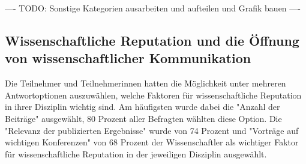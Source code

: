 ---- TODO: Sonstige Kategorien ausarbeiten und aufteilen und Grafik bauen ----

\subsection{Wissenschaftliche Reputation und die Öffnung von wissenschaftlicher Kommunikation}

Die Teilnehmer und Teilnehmerinnen hatten die Möglichkeit unter mehreren Antwortoptionen auszuwählen, welche Faktoren für wissenschaftliche Reputation in ihrer Disziplin wichtig sind. Am häufigsten wurde dabei die "Anzahl der Beiträge" ausgewählt, 80 Prozent aller Befragten wählten diese Option. Die "Relevanz der publizierten Ergebnisse" wurde von 74 Prozent und "Vorträge auf wichtigen Konferenzen" von 68 Prozent der Wissenschaftler als wichtiger Faktor für wissenschaftliche Reputation in der jeweiligen Disziplin ausgewählt.

